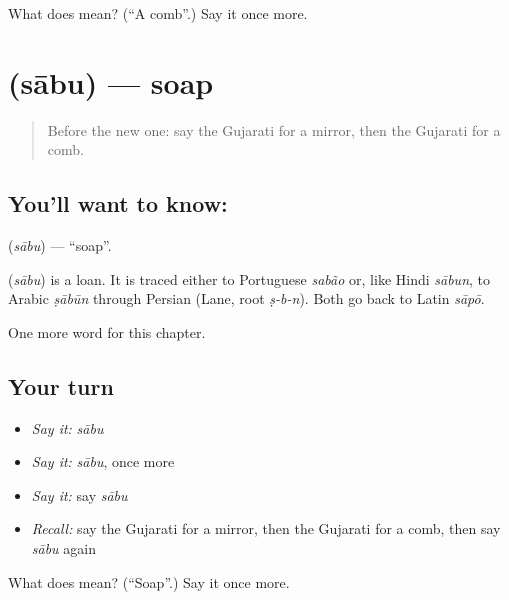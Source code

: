 \begin{tcolorbox}[breakable,colback=teal!4,colframe=teal!35!black,title={Before you move on}]
What does  mean? (\textquotedblleft{}A comb\textquotedblright{}.) Say it once more.
\end{tcolorbox}
\section[\texorpdfstring{\gu{સાબુ} (sābu)}{સાબુ (sābu)}]{ (sābu) — soap}

\label{lesson:GU-C106-sabu}



\begin{quote}
Before the new one: say the Gujarati for a mirror, then the Gujarati for a comb.
\end{quote}

\subsection*{You'll want to know: }
\textbf{} (\emph{sābu}) — \textquotedblleft{}soap\textquotedblright{}.

\begin{cousinweb}
\textbf{} (\emph{sābu}) is a loan. It is traced either to Portuguese \emph{sabão} or, like Hindi \emph{sābun}, to Arabic \emph{ṣābūn} through Persian (Lane, root \emph{ṣ-b-n}). Both go back to Latin \emph{sāpō}.
\end{cousinweb}

\begin{grammarlens}[title={What you've built}]
One more word for this chapter.
\end{grammarlens}

\subsection*{Your turn}
\begin{itemize}
\raggedright
  \item \emph{Say it:} \emph{sābu}
  \item \emph{Say it:} \emph{sābu}, once more
  \item \emph{Say it:} say \emph{sābu}
  \item \emph{Recall:} say the Gujarati for a mirror, then the Gujarati for a comb, then say \emph{sābu} again
\end{itemize}

\begin{tcolorbox}[breakable,colback=teal!4,colframe=teal!35!black,title={Before you move on}]
What does  mean? (\textquotedblleft{}Soap\textquotedblright{}.) Say it once more.
\end{tcolorbox}
